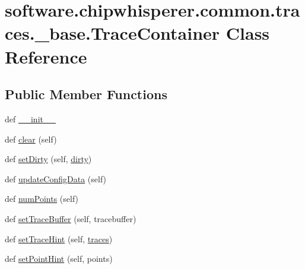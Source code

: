 \hypertarget{classsoftware_1_1chipwhisperer_1_1common_1_1traces_1_1__base_1_1TraceContainer}{}\section{software.\+chipwhisperer.\+common.\+traces.\+\_\+base.\+Trace\+Container Class Reference}
\label{classsoftware_1_1chipwhisperer_1_1common_1_1traces_1_1__base_1_1TraceContainer}
\subsection*{Public Member Functions}
\begin{DoxyCompactItemize}
\item 
def \hyperlink{classsoftware_1_1chipwhisperer_1_1common_1_1traces_1_1__base_1_1TraceContainer_a609ec03e29de777f02cda2956661bce8}{\+\_\+\+\_\+init\+\_\+\+\_\+}
\item 
def \hyperlink{classsoftware_1_1chipwhisperer_1_1common_1_1traces_1_1__base_1_1TraceContainer_a7c651f10ceed1d3e9d5915705204b316}{clear} (self)
\item 
def \hyperlink{classsoftware_1_1chipwhisperer_1_1common_1_1traces_1_1__base_1_1TraceContainer_a5048de25bdc50af64563764a95025da5}{set\+Dirty} (self, \hyperlink{classsoftware_1_1chipwhisperer_1_1common_1_1traces_1_1__base_1_1TraceContainer_a5829014f02d4f6aff1dfc8a234189641}{dirty})
\item 
def \hyperlink{classsoftware_1_1chipwhisperer_1_1common_1_1traces_1_1__base_1_1TraceContainer_ae84af421738a5386cc49c76029229732}{update\+Config\+Data} (self)
\item 
def \hyperlink{classsoftware_1_1chipwhisperer_1_1common_1_1traces_1_1__base_1_1TraceContainer_a0b5950236a5f7287f400ab9df66441e3}{num\+Points} (self)
\item 
def \hyperlink{classsoftware_1_1chipwhisperer_1_1common_1_1traces_1_1__base_1_1TraceContainer_a407f532a7c42e4d2a00ec71a2212958c}{set\+Trace\+Buffer} (self, tracebuffer)
\item 
def \hyperlink{classsoftware_1_1chipwhisperer_1_1common_1_1traces_1_1__base_1_1TraceContainer_af38dc97407bf2a995532346defc5b865}{set\+Trace\+Hint} (self, \hyperlink{classsoftware_1_1chipwhisperer_1_1common_1_1traces_1_1__base_1_1TraceContainer_ab5f9bde012609ff3df778893a84c21e8}{traces})
\item 
def \hyperlink{classsoftware_1_1chipwhisperer_1_1common_1_1traces_1_1__base_1_1TraceContainer_a645c392fdddbfe436341ba438bc91dd8}{set\+Point\+Hint} (self, points)

\end{DoxyCompactItemize}
